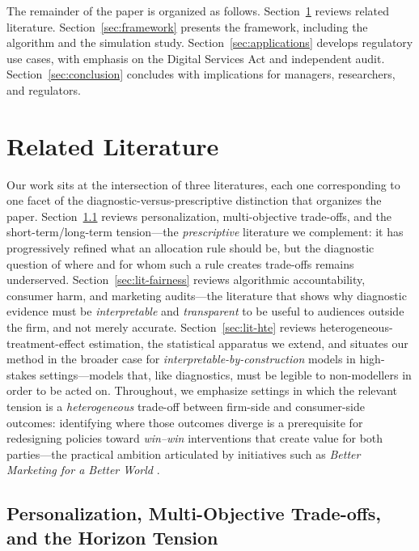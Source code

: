 \documentclass[11pt,letterpaper,english]{article}
\theoremstyle{definition}
\theoremstyle{definition}
\begin{document}
\begin{bibunit}
The remainder of the paper is organized as follows. Section~\ref{sec:related_lit} reviews related literature. Section~\ref{sec:framework} presents the framework, including the algorithm and the simulation study. Section~\ref{sec:applications} develops regulatory use cases, with emphasis on the Digital Services Act and independent audit. Section~\ref{sec:conclusion} concludes with implications for managers, researchers, and regulators.


\section{Related Literature}
\label{sec:related_lit}

Our work sits at the intersection of three literatures, each one corresponding to one facet of the diagnostic-versus-prescriptive distinction that organizes the paper. Section~\ref{sec:lit-multiobj} reviews personalization, multi-objective trade-offs, and the short-term/long-term tension---the \emph{prescriptive} literature we complement: it has progressively refined what an allocation rule should be, but the diagnostic question of where and for whom such a rule creates trade-offs remains underserved. Section~\ref{sec:lit-fairness} reviews algorithmic accountability, consumer harm, and marketing audits---the literature that shows why diagnostic evidence must be \emph{interpretable} and \emph{transparent} to be useful to audiences outside the firm, and not merely accurate. Section~\ref{sec:lit-hte} reviews heterogeneous-treatment-effect estimation, the statistical apparatus we extend, and situates our method in the broader case for \emph{interpretable-by-construction} models in high-stakes settings---models that, like diagnostics, must be legible to non-modellers in order to be acted on. Throughout, we emphasize settings in which the relevant tension is a \emph{heterogeneous} trade-off between firm-side and consumer-side outcomes: identifying where those outcomes diverge is a prerequisite for redesigning policies toward \emph{win--win} interventions that create value for both parties---the practical ambition articulated by initiatives such as \emph{Better Marketing for a Better World} \citep{chandy2021better}.

\subsection{Personalization, Multi-Objective Trade-offs, and the Horizon Tension}
\label{sec:lit-multiobj}


\end{bibunit}
\end{document}
